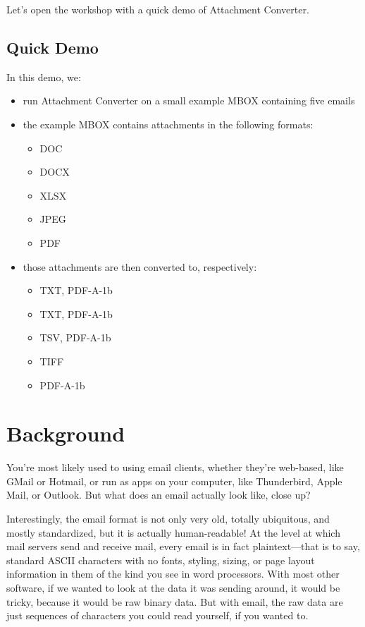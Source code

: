 \documentclass[11pt]{article}
\begin{document}
Let's open the workshop with a quick demo of Attachment Converter.

\subsection{Quick Demo}
\label{sec:orgfadce02}

In this demo, we:

\begin{itemize}
\item run Attachment Converter on a small example MBOX containing five
emails
\item the example MBOX contains attachments in the following formats:
\begin{itemize}
\item DOC
\item DOCX
\item XLSX
\item JPEG
\item PDF
\end{itemize}
\item those attachments are then converted to, respectively:
\begin{itemize}
\item TXT, PDF-A-1b
\item TXT, PDF-A-1b
\item TSV, PDF-A-1b
\item TIFF
\item PDF-A-1b
\end{itemize}
\end{itemize}

\section{Background}
\label{sec:org4f14ac1}

You're most likely used to using email clients, whether they're
web-based, like GMail or Hotmail, or run as apps on your computer,
like Thunderbird, Apple Mail, or Outlook.  But what does an email
actually look like, close up?

Interestingly, the email format is not only very old, totally
ubiquitous, and mostly standardized, but it is actually
human-readable!  At the level at which mail servers send and receive
mail, every email is in fact plaintext---that is to say, standard
ASCII characters with no fonts, styling, sizing, or page layout
information in them of the kind you see in word processors.  With most
other software, if we wanted to look at the data it was sending
around, it would be tricky, because it would be raw binary data.  But
with email, the raw data are just sequences of characters you could
read yourself, if you wanted to.
\end{document}
